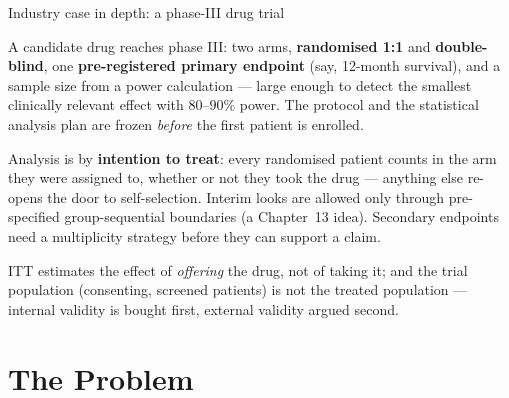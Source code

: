 \documentclass[aspectratio=169,11pt]{beamer}
\begin{document}
\begin{frame}{Industry case in depth: a phase-III drug trial}
  \footnotesize
  \begin{industry}
    A candidate drug reaches phase III: two arms, \textbf{randomised 1:1} and
    \textbf{double-blind}, one \textbf{pre-registered primary endpoint} (say, 12-month
    survival), and a sample size from a power calculation --- large enough to detect the
    smallest clinically relevant effect with $80$--$90\%$ power. The protocol and the
    statistical analysis plan are frozen \emph{before} the first patient is enrolled.
  \end{industry}
  \begin{readme}
    Analysis is by \textbf{intention to treat}: every randomised patient counts in the arm
    they were assigned to, whether or not they took the drug --- anything else re-opens the
    door to self-selection. Interim looks are allowed only through pre-specified
    group-sequential boundaries (a Chapter~13 idea). Secondary endpoints need a
    multiplicity strategy before they can support a claim.
  \end{readme}
  \begin{takeaway}
    ITT estimates the effect of \emph{offering} the drug, not of taking it; and the trial
    population (consenting, screened patients) is not the treated population --- internal
    validity is bought first, external validity argued second.
  \end{takeaway}
\end{frame}

\section{The Problem}
\end{document}
